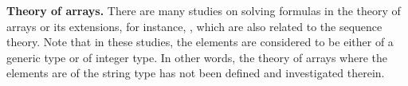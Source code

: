 

\smallskip
\noindent
{\bf Theory of arrays.}
There are many studies on solving formulas in the theory of arrays or its extensions, for instance, \cite{SBDL01,BMS06,HIV08,FalkeMS13,DacaHK16,FarinierDBL18}, which are also related to the sequence theory. Note that in these studies, the elements are considered to be either of a generic type or of integer type. In other words, the theory of arrays where the elements are of the string type has not been defined and investigated therein. 

% 


